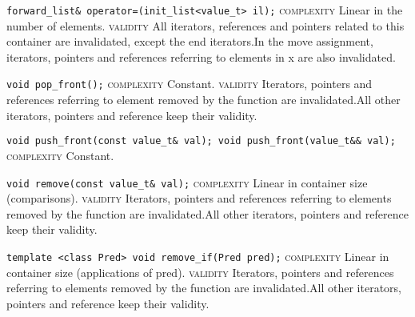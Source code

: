 \noindent{}\hspace*{0.25em}\lstinline[basicstyle=\ttfamily\color{corange}]{forward_list& operator=(init_list<value_t> il);} \textsc{complexity} Linear in the number of elements. \textsc{validity} All iterators, references and pointers related to this container are invalidated, except the end iterators.In the move assignment, iterators, pointers and references referring to elements in x are also invalidated.\\\vspace{-0.6em}

\noindent{}\hspace*{0.25em}\lstinline[basicstyle=\ttfamily\color{cgreen}]{void pop_front();} \textsc{complexity} Constant. \textsc{validity} Iterators, pointers and references referring to element removed by the function are invalidated.All other iterators, pointers and reference keep their validity.\\\vspace{-0.6em}

\noindent{}\hspace*{0.25em}\lstinline[basicstyle=\ttfamily\color{cgreen}]{void push_front(const value_t& val); void push_front(value_t&& val);} \textsc{complexity} Constant.\\\vspace{-0.6em}

\noindent{}\hspace*{0.25em}\lstinline[basicstyle=\ttfamily\color{corange}]{void remove(const value_t& val);} \textsc{complexity} Linear in container size (comparisons). \textsc{validity} Iterators, pointers and references referring to elements removed by the function are invalidated.All other iterators, pointers and reference keep their validity.\\\vspace{-0.6em}

\noindent{}\hspace*{0.25em}\lstinline[basicstyle=\ttfamily\color{corange}]{template <class Pred> void remove_if(Pred pred);} \textsc{complexity} Linear in container size (applications of pred). \textsc{validity} Iterators, pointers and references referring to elements removed by the function are invalidated.All other iterators, pointers and reference keep their validity.\\\vspace{-0.6em}

